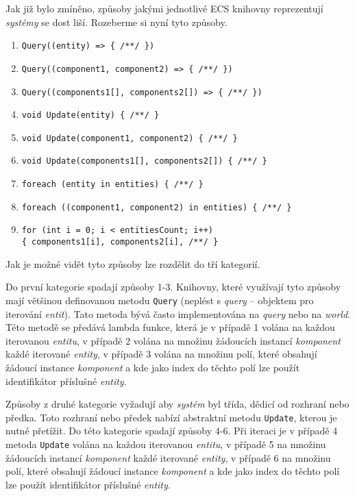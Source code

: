 Jak již bylo zmíněno, způsoby jakými jednotlivé ECS knihovny reprezentují \textit{systémy} se dost liší. Rozeberme si nyní tyto způsoby.

\begin{enumerate}
    \item \verb|Query((entity) => { /**/ })|
    \item \verb|Query((component1, component2) => { /**/ })|
    \item \verb|Query((components1[], components2[]) => { /**/ })|
    \item \verb|void Update(entity) { /**/ }|
    \item \verb|void Update(component1, component2) { /**/ }|
    \item \verb|void Update(components1[], components2[]) { /**/ }|
    \item \verb|foreach (entity in entities) { /**/ }|
    \item \verb|foreach ((component1, component2) in entities) { /**/ }|
    \item \verb|for (int i = 0; i < entitiesCount; i++)|\\\verb|{ components1[i], components2[i], /**/ }|
\end{enumerate}

Jak je možné vidět tyto způsoby lze rozdělit do tří kategorií.

Do první kategorie spadají způsoby 1-3. Knihovny, které využívají tyto způsoby mají většinou definovanou metodu \verb|Query| (neplést s \textit{query} -- objektem pro iterování \textit{entit}). Tato metoda bývá často implementována na \textit{query} nebo na \textit{world}. Této metodě se předává lambda funkce, která je v případě 1 volána na každou iterovanou \textit{entitu}, v případě 2 volána na množinu žádoucích instancí \textit{komponent} každé iterované \textit{entity}, v případě 3 volána na množinu polí, které obsahují žádoucí instance \textit{komponent} a kde jako index do těchto polí lze použít identifikátor příslušné \textit{entity}.

Způsoby z druhé kategorie vyžadují aby \textit{systém} byl třída, dědicí od rozhraní nebo předka. Toto rozhraní nebo předek nabízí abstraktní metodu \verb|Update|, kterou je nutné přetížit. Do této kategorie spadají způsoby 4-6. Při iteraci je v případě 4 metoda \verb|Update| volána na každou iterovanou \textit{entitu}, v případě 5 na množinu žádoucích instancí \textit{komponent} každé iterované \textit{entity}, v případě 6 na množinu polí, které obsahují žádoucí instance \textit{komponent} a kde jako index do těchto polí lze použít identifikátor příslušné \textit{entity}.

